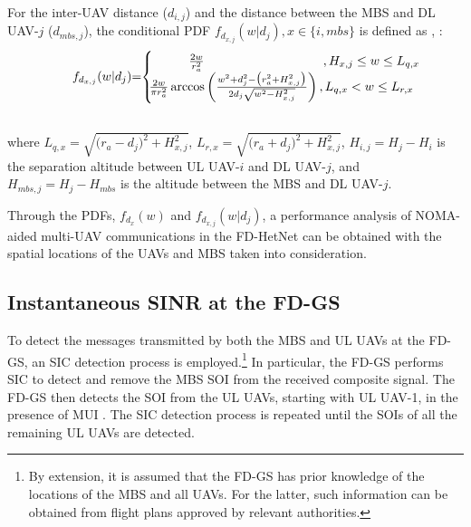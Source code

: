 For the inter-UAV distance ($d_{i,j}$) and the distance between the MBS and DL UAV-$j$ ($d_{mbs,j}$), the conditional PDF $f_{d_{x,j}}(w|d_{j}), x \in \{i,mbs\}$ is defined as \cite[eq. (2)]{chetlur2017downlink}, \cite[eq. (1)]{ernest2019hybrid}:
\begin{eqnarray}
f_{d_{x,j}}(w|d_{j}) \hspace{-0.1cm} = \hspace{-0.1cm} \begin{cases}
    \hspace{1cm} \frac{2w}{r_a^2} \hspace{3.3cm}, H_{x,j} \leq w \leq L_{q,x}\\
    \hspace{-0.1cm} \frac{2w}{\pi r_a^2}\arccos\left( \frac{w^2 + d_{j}^2 - \big(r_a^2+H_{x,j}^2\big)}{2d_{j}\sqrt{w^2 - H_{x,j}^2}} \right), L_{q,x} < w \leq L_{r,x}\\ 
  \end{cases}\hspace{-1cm} \\\nonumber
\end{eqnarray}
where $L_{q,x}=\sqrt{\big(r_a - d_{j}\big)^2 + H_{x,j}^2}$, $L_{r,x}=\sqrt{\big(r_a + d_{j}\big)^2 + H_{x,j}^2}$, $H_{i,j} = H_j - H_i$ is the separation altitude between UL UAV-$i$ and DL UAV-$j$, and $H_{mbs,j} = H_j - H_{mbs}$ is the altitude between the MBS and DL UAV-$j$.

Through the PDFs, $f_{d_{x}}(w)$ and $f_{d_{x,j}}(w|d_{j})$, a performance analysis of NOMA-aided multi-UAV communications in the FD-HetNet  can be obtained with the spatial locations of the UAVs and MBS taken into consideration. 

\subsection{Instantaneous SINR at the FD-GS}

To detect the messages transmitted by both the MBS and UL UAVs at the FD-GS, an SIC detection process is employed.\footnote{By extension, it is assumed that the FD-GS has prior knowledge of the locations of the MBS and all UAVs. For the latter, such information can be obtained from flight plans approved by relevant authorities.} In particular, the FD-GS performs SIC to detect and remove the MBS SOI from the received composite signal. The FD-GS then detects the SOI from the UL UAVs, starting with UL UAV-1, in the presence of MUI \cite{cui2016novel,kader2018full,salehi2019meta,weber2007transmission,islam2017power}. The SIC detection process is repeated until the SOIs of all the remaining UL UAVs are detected.

